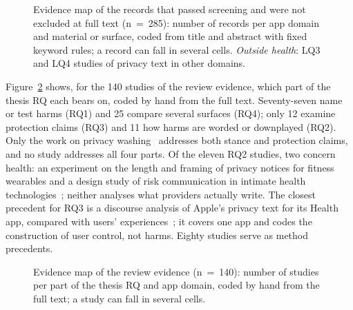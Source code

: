 \begin{figure}[tbp]
\centering

\caption[Evidence map: app domain and material studied]{Evidence map of the
records that passed screening and were not excluded at full text (n~=~285):
number of records per app domain and material or surface, coded from title and
abstract with fixed keyword rules; a record can fall in several cells.
\emph{Outside health}: LQ3 and LQ4 studies of privacy text in other domains.}
\label{fig:lit-map-surfaces}
\end{figure}

Figure~\ref{fig:lit-map-rq} shows, for the 140 studies of the review evidence,
which part of the thesis RQ each bears on, coded by hand from the full text.
Seventy-seven name or test harms (RQ1) and 25 compare several surfaces (RQ4);
only 12 examine protection claims (RQ3) and 11 how harms are worded or
downplayed (RQ2). Only the work on privacy
washing~\parencite{brackin2026privacy} addresses both stance and protection
claims, and no study addresses all four parts. Of the eleven RQ2 studies, two
concern health: an experiment on the length and framing of privacy notices for
fitness wearables and a design study of risk communication in intimate health
technologies~\parencite{moniz2025toward}; neither analyses what providers
actually write. The closest precedent for RQ3 is a discourse analysis of
Apple's privacy text for its Health app, compared with users'
experiences~\parencite{serttas2026bounded}; it covers one app and codes the
construction of user control, not harms. Eighty studies serve as method
precedents.

\begin{figure}[tbp]
\centering

\caption[Evidence map: parts of the RQ and app domain]{Evidence map of the
review evidence (n~=~140): number of studies per part of the thesis RQ and app
domain, coded by hand from the full text; a study can fall in several cells.}
\label{fig:lit-map-rq}
\end{figure}

